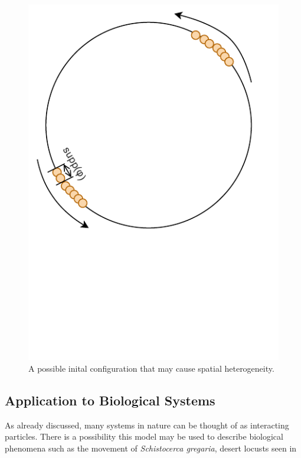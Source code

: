 \begin{figure}
    \centering
    \includegraphics[width=0.5\linewidth, trim={0 3cm 0 0}, clip]{Figures/compactphi}
    \caption[A Potential Initial Configuration]{A possible inital configuration that may cause spatial heterogeneity.}
    \label{fig:compactphi}
\end{figure}

\subsection{Application to Biological Systems}
As already discussed, many systems in nature can be thought of as interacting particles. There is a possibility this model may be used to describe biological phenomena such as the movement of \emph{Schistocerca gregaria}, desert locusts seen in 
